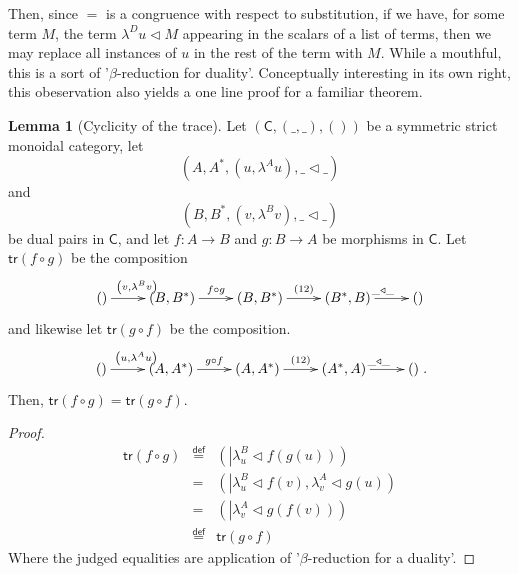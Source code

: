 \documentclass[pra,floatfix,
amsmath,superscriptaddress, 12pt]{article}
\theoremstyle{definition}
\newtheorem{lem}[thm]{Lemma}
\begin{document}
\par

Then, since $=$ is a congruence with respect
to substitution, if we have, for some term $M$, the term $\lambda^{D}u\triangleleft M$
appearing in the scalars of a list of terms, then we may replace all
instances of $u$ in the rest of the term with $M$. While a mouthful,
this is a sort of '$\beta$-reduction for duality'. Conceptually interesting in its own right, this obeservation also yields a one line
proof for a familiar theorem.
\begin{lem}
[Cyclicity of the trace] Let $\left(\mathsf{C},\left(\_,\_\right),\left(\right)\right)$
be a symmetric strict monoidal category, let 
\[
\left(A,A^{*},\left(u,\lambda^{A}u\right),\_\triangleleft\_\right)
\]
 and 
\[
\left(B,B^{*},\left(v,\lambda^{B}v\right),\_\triangleleft\_\right)
\]
 be dual pairs in $\mathsf{C}$, and let $f:A\longrightarrow B$ and $g:B\longrightarrow A$
be morphisms in $\mathsf{C}$. Let $\mathsf{tr}\left(f\circ g\right)$ be
the composition 
\[
\xymatrixrowsep{0pc}\xymatrix{\left(\right)\ar[r]^{\left(v,\lambda^{B}v\right)} & \left(B,B^{*}\right)\ar[r]^{f\circ g} & \left(B,B^{*}\right)\ar[r]^{\left(12\right)} & \left(B^{*},B\right)\ar[r]^{\_\triangleleft\_} & \left(\right)}
\]
and likewise let $\mathsf{tr}\left(g\circ f\right)$ be the composition.
\[
\xymatrixrowsep{0pc}\xymatrix{\left(\right)\ar[r]^{\left(u,\lambda^{A}u\right)} & \left(A,A^{*}\right)\ar[r]^{g\circ f} & \left(A,A^{*}\right)\ar[r]^{\left(12\right)} & \left(A^{*},A\right)\ar[r]^{\_\triangleleft\_} & \left(\right)}
.
\]
Then, $\mathsf{tr}\left(f\circ g\right)=\mathsf{tr}\left(g\circ f\right)$.
\end{lem}

\begin{proof}
\begin{eqnarray*}
\mathsf{tr}\left(f\circ g\right) & \overset{\mathsf{def}}{=} & \left(\left|\lambda_{u}^{B}\triangleleft f\left(g\left(u\right)\right)\right.\right)\\
 & = & \left(\left|\lambda_{u}^{B}\triangleleft f\left(v\right)\right.,\lambda_{v}^{A}\triangleleft g\left(u\right)\right)\\
 & = & \left(\left|\lambda_{v}^{A}\triangleleft g\left(f\left(v\right)\right)\right.\right)\\
 & \overset{\mathsf{def}}{=} & \mathsf{tr}\left(g\circ f\right)
\end{eqnarray*}
Where the judged equalities are application of '$\beta$-reduction
for a duality'.
\end{proof}
\end{document}
